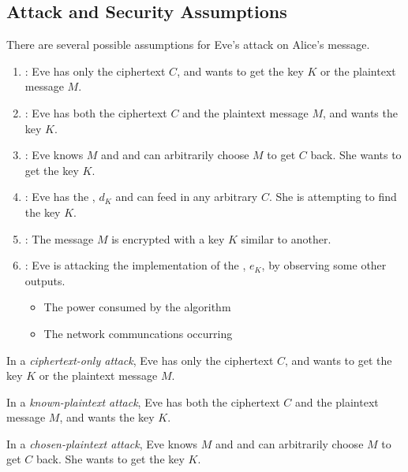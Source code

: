 \subsection{Attack and Security Assumptions}\label{subsec:Shannon_Attack_Security_Assumptions}
There are several possible assumptions for Eve's attack on Alice's message.
\begin{enumerate}[noitemsep]
\item \emph{}: Eve has only the ciphertext $C$, and wants to get the key $K$ or the plaintext message $M$.
\item \emph{}: Eve has both the ciphertext $C$ and the plaintext message $M$, and wants the key $K$.
\item \emph{}: Eve knows $M$ and and can arbitrarily choose $M$ to get $C$ back. She wants to get the key $K$.
\item \emph{}: Eve has the , $d_{K}$ and can feed in any arbitrary $C$. She is attempting to find the key $K$.
\item \emph{}: The message $M$ is encrypted with a key $K$ similar to another.
\item \emph{}: Eve is attacking the implementation of the , $e_{K}$, by observing some other outputs.
  \begin{itemize}[noitemsep]
  \item The power consumed by the algorithm
  \item The network communcations occurring
  \end{itemize}
\end{enumerate}

\begin{definition}\label{def:Attack-Ciphertext_Only}
  In a \emph{ciphertext-only attack}, Eve has only the ciphertext $C$, and wants to get the key $K$ or the plaintext message $M$.
\end{definition}

\begin{definition}\label{def:Attack-Known_Plaintext}
  In a \emph{known-plaintext attack}, Eve has both the ciphertext $C$ and the plaintext message $M$, and wants the key $K$.
\end{definition}

\begin{definition}\label{def:Attack-Chosen_Plaintext}
  In a \emph{chosen-plaintext attack}, Eve knows $M$ and and can arbitrarily choose $M$ to get $C$ back. She wants to get the key $K$.
\end{definition}

